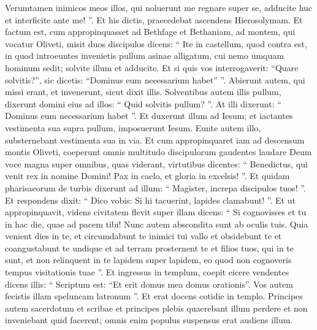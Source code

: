 \begin{biblechapter}
\begin{biblechapter}
\begin{biblechapter}
\begin{biblechapter}
\begin{biblechapter}
\begin{biblechapter}
\begin{biblechapter}
\begin{biblechapter}
\begin{biblechapter}
\begin{biblechapter}
\begin{biblechapter}
\begin{biblechapter}
\begin{biblechapter}
\begin{biblechapter}
\begin{biblechapter}
\begin{biblechapter}
\begin{biblechapter}
\begin{biblechapter}
\begin{biblechapter}
\verse Verumtamen inimicos meos illos, qui noluerunt me regnare super se, adducite huc et interficite ante me! ”.
 \verse Et his dictis, praecedebat ascendens Hierosolymam.
 \verse Et factum est, cum appropinquasset ad Bethfage et Bethaniam, ad montem, qui vocatur Oliveti, misit duos discipulos 
\verse dicens: “ Ite in castellum, quod contra est, in quod introeuntes invenietis pullum asinae alligatum, cui nemo umquam hominum sedit; solvite illum et adducite. 
\verse Et si quis vos interrogaverit: “Quare solvitis?”, sic dicetis: “Dominus eum necessarium habet” ”. 
\verse Abierunt autem, qui missi erant, et invenerunt, sicut dixit illis. 
 \verse Solventibus autem illis pullum, dixerunt domini eius ad illos: “ Quid solvitis pullum? ”. 
\verse At illi dixerunt: “ Dominus eum necessarium habet ”. 
 \verse Et duxerunt illum ad Iesum; et iactantes vestimenta sua supra pullum, imposuerunt Iesum. 
\verse Eunte autem illo, substernebant vestimenta sua in via. 
 \verse Et cum appropinquaret iam ad descensum montis Oliveti, coeperunt omnis multitudo discipulorum gaudentes laudare Deum voce magna super omnibus, quas viderant, virtutibus 
\verse dicentes:
 “ Benedictus, qui venit rex in nomine Domini!
 Pax in caelo, et gloria in excelsis! ”.
 \verse Et quidam pharisaeorum de turbis dixerunt ad illum: “ Magister, increpa discipulos tuos! ”. 
\verse Et respondens dixit: “ Dico vobis: Si hi tacuerint, lapides clamabunt! ”.
 \verse Et ut appropinquavit, videns civitatem flevit super illam 
\verse dicens: “ Si cognovisses et tu in hac die, quae ad pacem tibi! Nunc autem abscondita sunt ab oculis tuis. 
\verse Quia venient dies in te, et circumdabunt te inimici tui vallo et obsidebunt te et coangustabunt te undique 
\verse et ad terram prosternent te et filios tuos, qui in te sunt, et non relinquent in te lapidem super lapidem, eo quod non cognoveris tempus visitationis tuae ”.
 \verse Et ingressus in templum, coepit eicere vendentes 
\verse dicens illis: “ Scriptum est: “Et erit domus mea domus orationis”. Vos autem fecistis illam speluncam latronum ”.
 \verse Et erat docens cotidie in templo. Principes autem sacerdotum et scribae et principes plebis quaerebant illum perdere 
\verse et non inveniebant quid facerent; omnis enim populus suspensus erat audiens illum.
 

\end{biblechapter}
\end{biblechapter}
\end{biblechapter}
\end{biblechapter}
\end{biblechapter}
\end{biblechapter}
\end{biblechapter}
\end{biblechapter}
\end{biblechapter}
\end{biblechapter}
\end{biblechapter}
\end{biblechapter}
\end{biblechapter}
\end{biblechapter}
\end{biblechapter}
\end{biblechapter}
\end{biblechapter}
\end{biblechapter}
\end{biblechapter}

